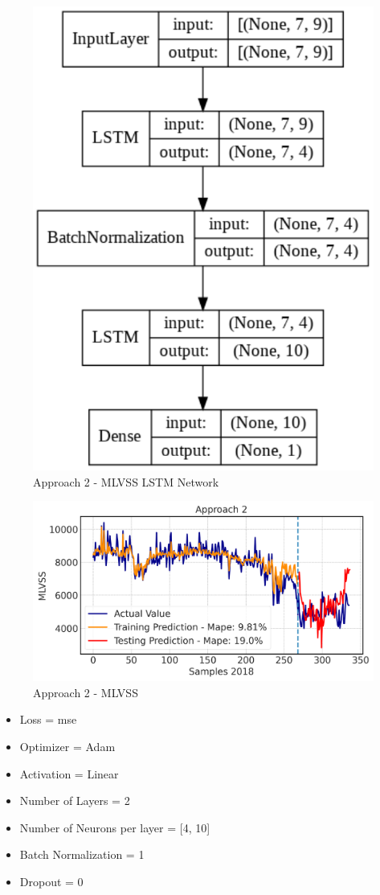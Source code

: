 \begin{figure}[h]
\centering
\includegraphics[width=0.4\linewidth]{figures/Ch5/App2_MLVSS.pdf}
\caption{Approach 2 - MLVSS LSTM Network}
\label{f:App2-MLVSS-nn}
\end{figure}

\begin{figure}[h]
\centering
\includegraphics[width=\linewidth]{figures/Ch5/MLVSS-approach2.pdf}
\caption{Approach 2 - MLVSS}
\label{f:App2-MLVSS}
\end{figure}

\begin{itemize}
    \item Loss = mse
    \item Optimizer = Adam
    \item Activation =  Linear
    \item Number of Layers = 2
    \item Number of Neurons per layer = [4, 10]
    \item Batch Normalization = 1
    \item Dropout = 0
\end{itemize}

